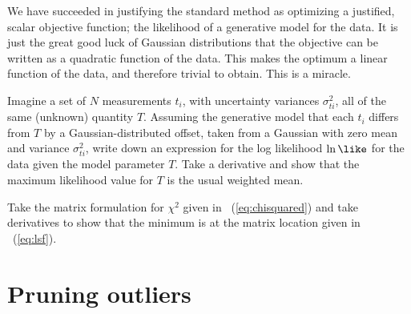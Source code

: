 \documentclass[12pt,twoside,pdftex]{article}
\begin{document}
We have succeeded in justifying the standard method as optimizing a
justified, scalar objective function; the likelihood of a generative
model for the data.  It is just the great good luck of Gaussian
distributions that the objective can be written as a quadratic
function of the data.  This makes the optimum a linear function of the
data, and therefore trivial to obtain.  This is a miracle.

\begin{problem}
Imagine a set of $N$ measurements $t_i$, with uncertainty variances
$\sigma_{ti}^2$, all of the same (unknown) quantity $T$.  Assuming the
generative model that each $t_i$ differs from $T$ by a
Gaussian-distributed offset, taken from a Gaussian with zero mean and
variance $\sigma_{ti}^2$, write down an expression for the log
likelihood $\ln\like$ for the data given the model parameter $T$.
Take a derivative and show that the maximum likelihood value for $T$
is the usual weighted mean.
\end{problem}

\begin{problem}
Take the matrix formulation for $\chi^2$ given in
\equationname~(\ref{eq:chisquared}) and take derivatives to show that
the minimum is at the matrix location given in
\equationname~(\ref{eq:lsf}).
\end{problem}

\section{Pruning outliers}\label{sec:outliers}
\end{document}
